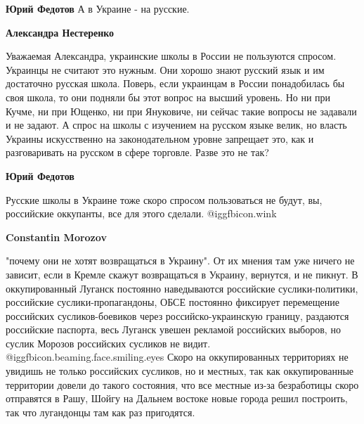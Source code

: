 \begin{itemize}
\begin{itemize}
\textbf{Юрий Федотов} А в Украине - на русские.

\textbf{Александра Нестеренко} 

Уважаемая Александра, украинские школы в России не пользуются спросом. Украинцы
не считают это нужным. Они хорошо знают русский язык и им достаточно русская
школа. Поверь, если украинцам в России понадобилась бы своя школа, то они подняли
бы этот вопрос на высший уровень. Но ни при Кучме, ни при Ющенко, ни при
Януковиче, ни сейчас такие вопросы не задавали и не задают. А спрос на школы с
изучением на русском языке велик, но власть Украины искусственно на
законодательном уровне запрещает это, как и разговаривать на русском в сфере
торговле. Разве это не так?


\textbf{Юрий Федотов} 

Русские школы в Украине тоже скоро спросом пользоваться не будут, вы,
российские оккупанты, все для этого сделали.  @igg{fbicon.wink} 

\textbf{Constantin Morozov} 

"почему они не хотят возвращаться в Украину". От их мнения там уже ничего не
зависит, если в Кремле скажут возвращаться в Украину, вернутся, и не пикнут. В
оккупированный Луганск постоянно наведываются российские суслики-политики,
российские суслики-пропагандоны, ОБСЕ постоянно фиксирует перемещение
российских сусликов-боевиков через российско-украинскую границу, раздаются
российские паспорта, весь Луганск увешен рекламой российских выборов, но суслик
Морозов российских сусликов не видит.  @igg{fbicon.beaming.face.smiling.eyes}  Скоро на оккупированных территориях не
увидишь не только российских сусликов, но и местных, так как оккупированные
территории довели до такого состояния, что все местные из-за безработицы скоро
отправятся в Рашу, Шойгу на Дальнем востоке новые города решил построить, так
что лугандонцы там как раз пригодятся.



\end{itemize}
\end{itemize}
